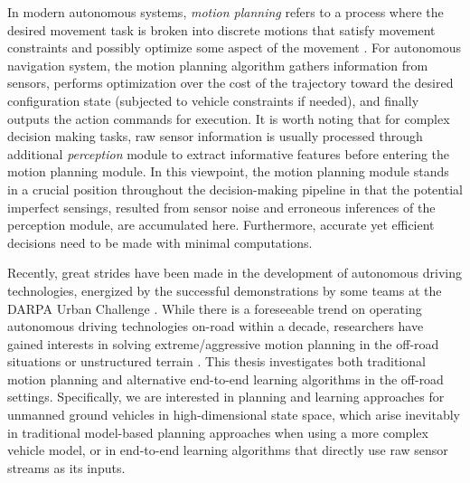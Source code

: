 \documentclass[../thesis.tex]{subfiles}
\begin{document}

In modern autonomous systems, \textit{motion planning} refers to a process where the desired movement task is broken into discrete motions that satisfy movement constraints and possibly optimize some aspect of the movement \cite{wiki:motion-planning}. 
For autonomous navigation system, the motion planning algorithm gathers information from sensors, performs optimization over the cost of the trajectory toward the desired configuration state (subjected to vehicle constraints if needed), and finally outputs the action commands for execution. 
It is worth noting that for complex decision making tasks, raw sensor information is usually processed through additional \textit{perception} module to extract informative features before entering the motion planning module.
In this viewpoint, the motion planning module stands in a crucial position throughout the decision-making pipeline in that the potential imperfect sensings, resulted from sensor noise and erroneous inferences of the perception module, are accumulated here. 
Furthermore, accurate yet efficient decisions need to be made with minimal computations.

Recently, great strides have been made in the development of autonomous driving technologies, energized by the successful demonstrations by some teams at the DARPA Urban Challenge \cite{boss, multimodaltartan}.
While there is a foreseeable trend on operating autonomous driving technologies on-road within a decade, researchers have gained interests in solving extreme/aggressive motion planning in the off-road situations or unstructured terrain \cite{kolter2010probabilistic,williams2016aggressive,gray2012predictive,cutler2016autonomous,cutler2014reinforcement}. 
This thesis investigates both traditional motion planning and alternative end-to-end learning algorithms in the off-road settings.
Specifically, we are interested in planning and learning approaches for unmanned ground vehicles in high-dimensional state space, which arise inevitably in traditional model-based planning approaches when using a more complex vehicle model, or in end-to-end learning algorithms that directly use raw sensor streams as its inputs.
\end{document}
